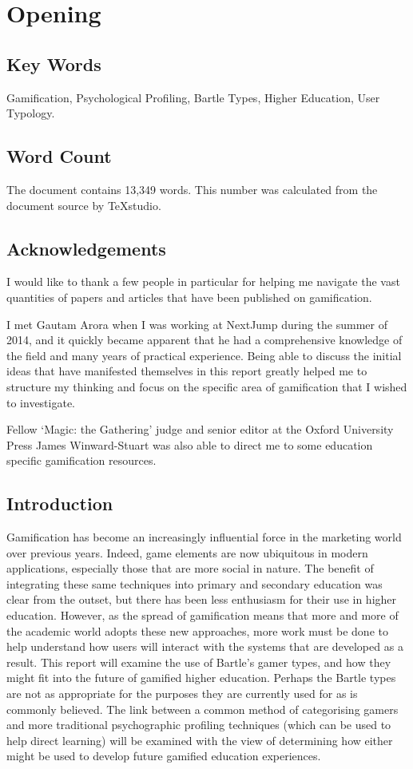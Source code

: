 \documentclass[12pt,a4paper,twoside]{report}
\begin{document}
\chapter{Opening}
\section{Key Words}
Gamification, Psychological Profiling, Bartle Types, Higher Education, User Typology.

\section{Word Count}
The document contains 13,349 words. This number was calculated from the document source by TeXstudio.

\section{Acknowledgements}
I would like to thank a few people in particular for helping me navigate the vast quantities of papers and articles that have been published on gamification. 

I met Gautam Arora when I was working at NextJump during the summer of 2014, and it quickly became apparent that he had a comprehensive knowledge of the field and many years of practical experience. Being able to discuss the initial ideas that have manifested themselves in this report greatly helped me to structure my thinking and focus on the specific area of gamification that I wished to investigate.

Fellow `Magic: the Gathering' judge and senior editor at the Oxford University Press James Winward-Stuart was also able to direct me to some education specific gamification resources.

\section{Introduction}
Gamification has become an increasingly influential force in the marketing world over previous years. Indeed, game elements are now ubiquitous in modern applications, especially those that are more social in nature. The benefit of integrating these same techniques into primary and secondary education was clear from the outset, but there has been less enthusiasm for their use in higher education. However, as the spread of gamification means that more and more of the academic world adopts these new approaches, more work must be done to help understand how users will interact with the systems that are developed as a result. This report will examine the use of Bartle's gamer types, and how they might fit into the future of gamified higher education. Perhaps the Bartle types are not as appropriate for the purposes they are currently used for as is commonly believed. The link between a common method of categorising gamers and more traditional psychographic profiling techniques (which can be used to help direct learning) will be examined with the view of determining how either might be used to develop future gamified education experiences.
\end{document}
